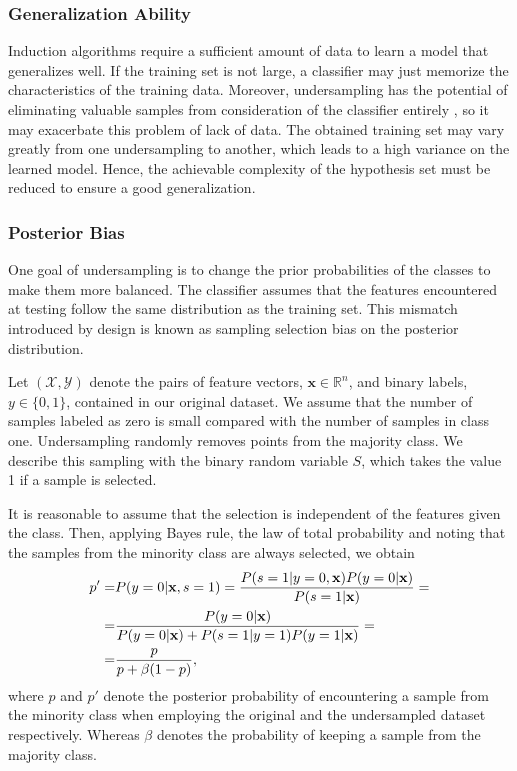 \documentclass[conference]{IEEEtran}
\begin{document}
	\subsubsection{Generalization Ability}
		Induction algorithms require a sufficient amount of data to learn a model that generalizes well.  If the training set is not large, a classifier may just memorize the characteristics of the training data. Moreover, undersampling has the potential of eliminating valuable samples from consideration of the classifier entirely \cite{undersampling_generalization}, so it may exacerbate this problem of lack of data. The obtained training set may vary greatly from one undersampling to another, which leads to a high variance on the learned model. Hence, the achievable complexity of the hypothesis set must be reduced to ensure a good generalization.
		
	\subsubsection{Posterior Bias}
		One goal of undersampling is to change the prior probabilities of the classes to make them more balanced. The classifier assumes that the features encountered at testing follow the same distribution as the training set. This mismatch introduced by design is known as sampling selection bias \cite{sampling_bias} on the posterior distribution.

		Let $(\mathcal{X}, \mathcal{Y})$ denote the pairs of feature vectors, $\mathbf{x} \in \mathbb{R}^n$,  and binary labels, $y \in \{0, 1\}$, contained in our original dataset. We assume that the number of samples labeled as zero is small compared with the number of samples in class one. Undersampling randomly removes points from the majority class. We describe this sampling with the binary random variable $S$, which takes the value 1 if a sample is selected.

		It is reasonable to assume that the selection is independent of the features given the class. Then, applying Bayes rule, the law of total probability and noting that the samples from the minority class are always selected, we obtain
		\begin{align*} \label{posterior}
			p' = & P(y=0|\mathbf{x}, s=1)=  \frac{P(s=1|y=0, \mathbf{x})P(y=0|\mathbf{x})}{P(s=1|\mathbf{x})}=\notag\\
					=&  \frac{P(y=0|\mathbf{x})}{P(y=0|\mathbf{x})+P(s=1|y=1)P(y=1|\mathbf{x})}=\notag\\
=&\frac{p}{p+\beta(1-p)},
		\end{align*}
where $p$ and $p'$ denote the posterior probability of encountering a sample from the minority class when employing the original and the undersampled dataset respectively. Whereas $\beta$ denotes the probability of keeping a sample from the majority class.
\end{document}
